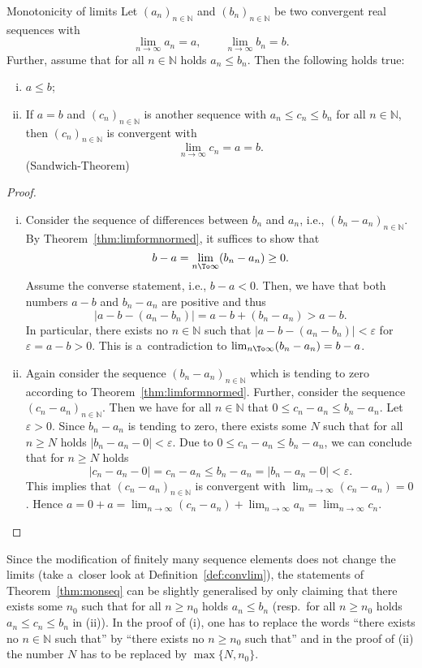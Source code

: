 \begin{Theorem}{Monotonicity of limits}\label{thm:monseq}
  Let $(a_n)_{n\in\mathbb{N}}$ and $(b_n)_{n\in\mathbb{N}}$ be two convergent real sequences with
\[\lim_{n\to\infty}a_n=a,\qquad \lim_{n\to\infty}b_n=b.\]
  Further, assume that for all $n\in\mathbb{N}$ holds $a_n\leq b_n$. Then the following holds true:
\begin{enumerate}[(i)]
 \item $a\leq b$;
 \item If $a=b$ and $(c_n)_{n\in\mathbb{N}}$ is another sequence with $a_n\leq c_n\leq b_n$ for all $n \in \mathbb{N}$, then $(c_n)_{n\in\mathbb{N}}$ is convergent with
\[\lim_{n\to\infty}c_n=a=b.\]
 \hfill {(Sandwich-Theorem)}
\end{enumerate}
\end{Theorem}
\begin{proof}
\begin{enumerate}[(i)]
\item 
  Consider the sequence of differences between $b_n$ and $a_n$, i.e., $(b_n-a_n)_{n\in\mathbb{N}}$. By Theorem~\ref{thm:limformnormed}, it suffices to show that
\[b-a=\lim_{n\To\infty}(b_n-a_n)\geq0.\]
Assume the converse statement, i.e., $b-a<0$. Then, we have that both numbers $a-b$ and $b_n-a_n$ are positive and thus
    \[|a-b-(a_n-b_n)|=a-b+(b_n-a_n)>a-b.\] In particular, there exists no $n\in\mathbb{N}$ such that $|a-b-(a_n-b_n)|<\varepsilon$ for $\varepsilon=a-b>0$. This is a~contradiction to $\lim_{n\To\infty}(b_n-a_n)=b-a$.
\item Again consider the sequence $(b_n-a_n)_{n\in\mathbb{N}}$ which is tending to zero according to Theorem~\ref{thm:limformnormed}. Further, consider the sequence $(c_n-a_n)_{n\in\mathbb{N}}$. 
Then we have
  for all $n\in\mathbb{N}$ that $0\leq c_n-a_n\leq b_n-a_n$.
Let $\varepsilon>0$. Since $b_n-a_n$ is tending to zero, there exists some $N$ such that for all $n\geq N$ holds $|b_n-a_n-0|<\varepsilon$. Due to $0\leq c_n-a_n\leq b_n-a_n$, we can conclude that for $n\geq N$ holds
\[|c_n-a_n-0|=c_n-a_n\leq b_n-a_n= |b_n-a_n-0|<\varepsilon.\]
    This implies that $(c_n-a_n)_{n\in\mathbb{N}}$ is convergent with $\lim_{n\to\infty}(c_n-a_n)=0$.
Hence $a=0+a=\lim_{n\rightarrow\infty} (c_n-a_n) + \lim_{n\rightarrow\infty} a_n = \lim_{n\rightarrow\infty} c_n $.
\end{enumerate}
\end{proof}

\begin{Remark}{}\label{rem:n_0mon}
  Since the modification of finitely many sequence elements does not change the limits (take a~closer look at Definition~\ref{def:convlim}), the statements of Theorem~\ref{thm:monseq} can be slightly generalised by only claiming that there exists some $n_0$ such that for all $n\geq n_0$ holds $a_n\leq b_n$ (resp.\ for all $n\geq n_0$ holds $a_n\leq c_n\leq b_n$ in (ii)). In the proof of (i), one has to replace the words ``there exists no $n\in\mathbb{N}$ such that'' by ``there exists no $n\geq n_0$ such that'' and in the proof of (ii) the number $N$ has to be replaced by $\max\{N,n_0\}$.
\end{Remark}

